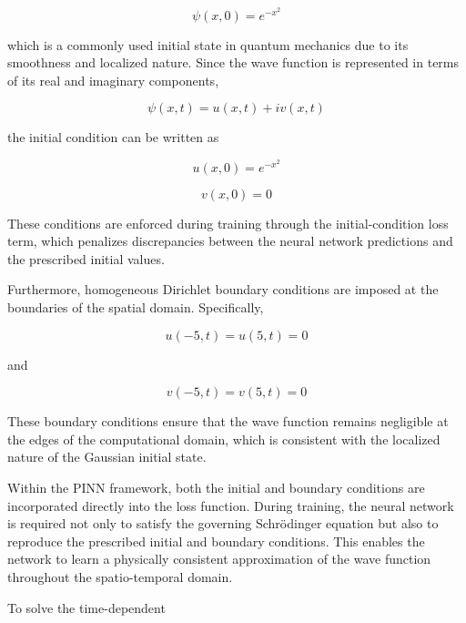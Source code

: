 \documentclass[11pt]{article}
\begin{document}
\begin{equation}
	\psi(x,0)=e^{-x^2}
\end{equation}

which is a commonly used initial state in quantum mechanics 
due to its smoothness and localized nature. Since the wave 
function is represented in terms of its real and imaginary 
components,

\begin{equation}
	\psi(x,t)=u(x,t)+iv(x,t)
\end{equation}

the initial condition can be written as

\begin{equation}
	u(x,0)=e^{-x^2}
\end{equation}


\begin{equation}
	v(x,0)=0
\end{equation}

These conditions are enforced during training through the initial-condition 
loss term, which penalizes discrepancies between the 
neural network predictions and the prescribed initial values.

Furthermore, homogeneous Dirichlet boundary conditions are 
imposed at the boundaries of the spatial domain. 
Specifically,

\begin{equation}
	u(-5,t)=u(5,t)=0
\end{equation}

and

\begin{equation}
	v(-5,t)=v(5,t)=0
\end{equation}


These boundary conditions ensure that the wave function 
remains negligible at the edges of the computational domain, 
which is consistent with the localized nature of the 
Gaussian initial state.

Within the PINN framework, 
both the initial and boundary conditions are 
incorporated directly into the loss function. 
During training, the neural network is required not 
only to satisfy the governing Schrödinger equation but 
also to reproduce the prescribed initial and boundary 
conditions. This enables the network to learn a physically 
consistent approximation of the wave function throughout 
the spatio-temporal domain.



To solve the time-dependent 
\end{document}
